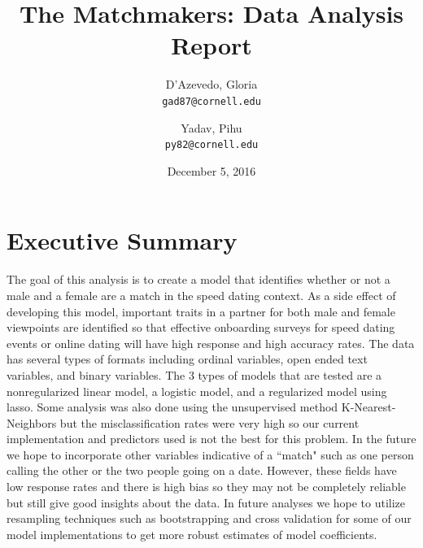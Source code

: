 \documentclass{article}
\title{The Matchmakers: Data Analysis Report}
\author{
  D'Azevedo, Gloria\\
  \texttt{gad87@cornell.edu}
  \and
  Yadav, Pihu\\
  \texttt{py82@cornell.edu}
}
\date{December 5, 2016}
\begin{document}
\maketitle

\section{Executive Summary}
The goal of this analysis is to create a model that identifies whether or not a male and a female are a match in the speed dating context.  As a side effect of developing this model, important traits in a partner for both male and female viewpoints are identified so that effective onboarding surveys for speed dating events or online dating will have high response and high accuracy rates.  The data has several types of formats including ordinal variables, open ended text variables, and binary variables.  The 3 types of models that are tested are a nonregularized linear model, a logistic model, and a regularized model using lasso.  Some analysis was also done using the unsupervised method K-Nearest-Neighbors but the misclassification rates were very high so our current implementation and predictors used is not the best for this problem.  In the future we hope to incorporate other variables indicative of a ``match" such as one person calling the other or the two people going on a date.  However, these fields have low response rates and there is high bias so they may not be completely reliable but still give good insights about the data.  In future analyses we hope to utilize resampling techniques such as bootstrapping and cross validation for some of our model implementations to get more robust estimates of model coefficients.
\end{document}
